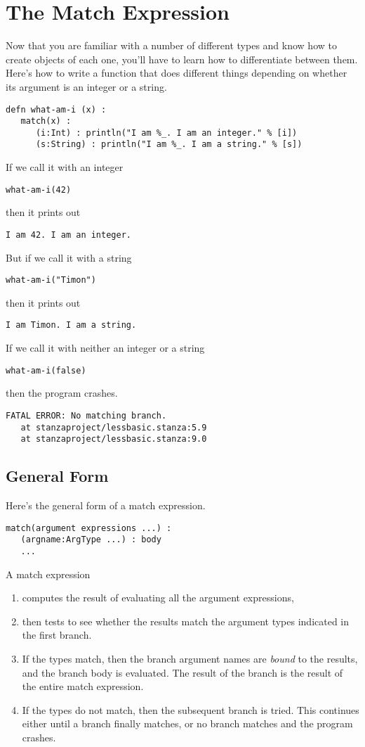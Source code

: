 \documentclass[10pt,oneside]{book}
\begin{document}
\section{The Match Expression}
Now that you are familiar with a number of different types and know how to create objects of each one, you'll have to learn how to differentiate between them. 
Here's how to write a function that does different things depending on whether its argument is an integer or a string.
\begin{lstlisting}
defn what-am-i (x) :
   match(x) :
      (i:Int) : println("I am %_. I am an integer." % [i])
      (s:String) : println("I am %_. I am a string." % [s])
\end{lstlisting}
If we call it with an integer
\begin{lstlisting}
what-am-i(42)
\end{lstlisting}
then it prints out
\begin{lstlisting}
I am 42. I am an integer.
\end{lstlisting}

But if we call it with a string
\begin{lstlisting}
what-am-i("Timon")
\end{lstlisting}
then it prints out
\begin{lstlisting}
I am Timon. I am a string.
\end{lstlisting}

If we call it with neither an integer or a string
\begin{lstlisting}
what-am-i(false)
\end{lstlisting}
then the program crashes.
\begin{lstlisting}
FATAL ERROR: No matching branch.
   at stanzaproject/lessbasic.stanza:5.9
   at stanzaproject/lessbasic.stanza:9.0
\end{lstlisting}

\subsection*{General Form}
Here's the general form of a match expression.
\begin{lstlisting}
match(argument expressions ...) :
   (argname:ArgType ...) : body
   ...
\end{lstlisting}
A match expression
\begin{enumerate}
\item computes the result of evaluating all the argument expressions,
\item then tests to see whether the results match the argument types indicated in the first branch.
\item If the types match, then the branch argument names are {\em bound} to the results, and the branch body is evaluated. The result of the branch is the result of the entire match expression.
\item If the types do not match, then the subsequent branch is tried. This continues either until a branch finally matches, or no branch matches and the program crashes.
\end{enumerate}
\end{document}
